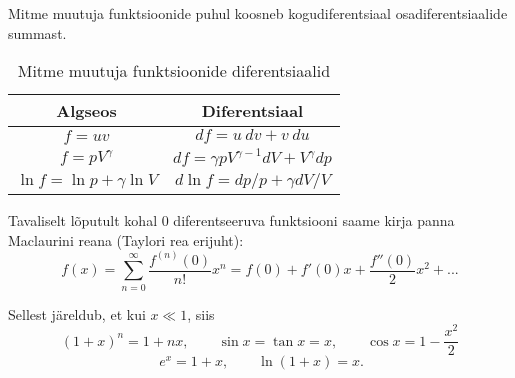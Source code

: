 \documentclass[a4paper,11pt,twocolumn]{article}
\begin{document}
Mitme muutuja funktsioonide puhul koosneb kogudiferentsiaal osadiferentsiaalide summast.

\begin{table}[h!]
	\centering
	\caption{Mitme muutuja funktsioonide diferentsiaalid}
	\begin{tabular}{ c | c}
		\hline \hline
		Algseos & Diferentsiaal \\ 
		\hline
		\( f=uv \) & \( df=u\ dv+v\ du \) \\  
		\( f=pV^\gamma \) & \( df=\gamma pV^{\gamma-1} dV +V^\gamma dp \) \\
		\( \ln f=\ln p +\gamma \ln V \) & \( d\ln f= dp/p+\gamma dV/V \)
	\end{tabular}
\end{table}

Tavaliselt lõputult kohal 0 diferentseeruva funktsiooni saame kirja panna Maclaurini reana (Taylori rea erijuht): 
\[ f(x)=\sum_{n=0}^{\infty}\frac{f^{(n)} (0)}{n!} x^{n} = f(0) + f'(0) x + \frac{f''(0)}{2} x^2 +...\]

Sellest järeldub, et kui \( x\ll 1 \), siis 
\[ (1+x)^n=1+nx, \qquad \sin x=\tan x=x, \qquad \cos x=1-\frac{x^2}{2} \] 
\[ \ e^x=1+x, \qquad \ln (1+x)=x. \]
\end{document}
